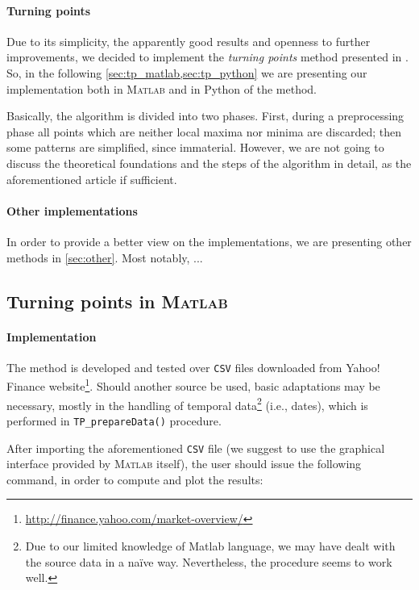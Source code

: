 \documentclass[a4paper]{article}
\newcommand{\matlab}{\textsc{Matlab}\xspace}
\newcommand{\csv}{\texttt{CSV}\xspace}
\begin{document}
\paragraph{Turning points} Due to its simplicity, the apparently good results and openness to further improvements, we decided to implement the \emph{turning points} method presented in \cite{5961935}. So, in the following \cref{sec:tp_matlab,sec:tp_python} we are presenting our implementation both in \matlab and in Python of the method.

Basically, the algorithm is divided into two phases. First, during a preprocessing phase all points which are neither local maxima nor minima are discarded; then some patterns are simplified, since immaterial. However, we are not going to discuss the theoretical foundations and the steps of the algorithm in detail, as the aforementioned article if sufficient.

\paragraph{Other implementations} In order to provide a better view on the implementations, we are presenting other methods in \cref{sec:other}. Most notably, ... %



\subsection{Turning points in \matlab}\label{sec:tp_matlab}

\paragraph{Implementation} The method is developed and tested over \csv files downloaded from Yahoo! Finance website\footnote{\url{http://finance.yahoo.com/market-overview/}}. Should another source be used, basic adaptations may be necessary, mostly in the handling of temporal data\footnote{Due to our limited knowledge of Matlab language, we may have dealt with the source data in a na{\"i}ve way. Nevertheless, the procedure seems to work well.} (i.e., dates), which is performed in \texttt{TP\_prepareData()} procedure. 

After importing the aforementioned \csv file (we suggest to use the graphical interface provided by \matlab itself), the user should issue the following command, in order to compute and plot the results: 
\end{document}
